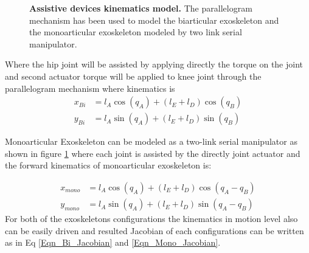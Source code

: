 \documentclass[10pt,letterpaper]{article}
\begin{document}
\begin{figure}[h!]
	\centering
	\hfil
	\vspace{1mm}
	\caption{\small{\textbf{Assistive devices kinematics model.} The parallelogram mechanism has been used to model the biarticular exoskeleton and the monoarticular exoskeleton modeled by two link serial manipulator.}}
	\label{Fig_Exos_Kinematics_Model}
\end{figure}
Where the hip joint will be assisted by applying directly the torque on the joint and second actuator torque will be applied to knee joint through the parallelogram mechanism where kinematics is 
\begin{align}\label{Eqn_Bi_Kin}
x_{Bi} &= l_ {A}\cos (q_ {A}) + (l_ {E} + l_ {D})\cos (q_ {B})\\
y_{Bi} &= l_ {A}\sin (q_ {A}) + (l_ {E} + l_ {D})\sin (q_ {B})
\end{align}

Monoarticular Exoskeleton can be modeled as a two-link serial manipulator as shown in figure \ref{Fig_Exos_Kinematics_Model} where each joint is assisted by the directly joint actuator and the forward kinematics of monoarticular exoskeleton is:

\begin{align}\label{Eqn_Mono_Kin}
x_{mono} &= l_ {A}\cos (q_ {A}) + (l_ {E} + l_ {D})\cos (q_ {A} - q_ {B})\\
y_{mono} &= l_ {A}\sin (q_ {A}) + (l_ {E} + l_ {D})\sin (q_ {A} - q_ {B})
\end{align}
For both of the exoskeletons configurations the kinematics in motion level also can be easily driven and resulted Jacobian of each configurations can be written as in Eq \eqref{Eqn_Bi_Jacobian} and \eqref{Eqn_Mono_Jacobian}.
\end{document}
